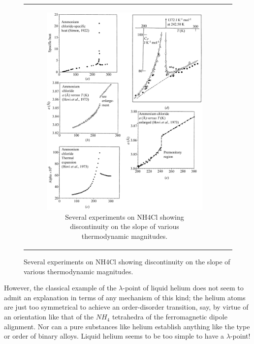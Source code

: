 \documentclass{article}
\begin{document}
\begin{figure}[H]
\begin{tabular}{cc}
\begin{subfigure}{0.5\textwidth}
            \includegraphics[width=\linewidth]{Images/AmmoniumChloride.png}
            \caption{Several experiments on NH4Cl showing discontinuity on the slope of various thermodynamic magnitudes.}
            \label{fig:enter-label}
        \end{subfigure}
   
    \end{tabular}
\end{figure}

However, the classical example of the $\lambda$-point of liquid helium does not seem to admit an explanation in terms of any mechanism of this kind; the helium atoms are just too symmetrical to achieve an order-disorder transition, say, by virtue of an orientation like that of the $NH_4$ tetrahedra of the ferromagnetic dipole alignment. Nor can a pure substances like helium establish anything like the type or order of binary alloys. Liquid helium seems to be too simple to have a $\lambda$-point!
\\
\end{document}
